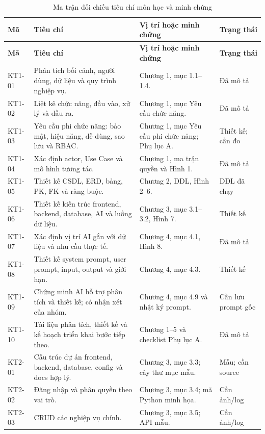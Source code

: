 \begin{longtable}{|C{1.0cm}|L{5.0cm}|L{4.7cm}|L{2.3cm}|}
\caption{Ma trận đối chiếu tiêu chí môn học và minh chứng}\label{tab:criteria-matrix}\\
\hline
\textbf{Mã} & \textbf{Tiêu chí} & \textbf{Vị trí hoặc minh chứng} & \textbf{Trạng thái}\\
\hline\endfirsthead
\hline
\textbf{Mã} & \textbf{Tiêu chí} & \textbf{Vị trí hoặc minh chứng} & \textbf{Trạng thái}\\
\hline\endhead
KT1-01 & Phân tích bối cảnh, người dùng, dữ liệu và quy trình nghiệp vụ. & Chương 1, mục 1.1--1.4. & Đã mô tả\\\hline
KT1-02 & Liệt kê chức năng, đầu vào, xử lý và đầu ra. & Chương 1, mục Yêu cầu chức năng. & Đã mô tả\\\hline
KT1-03 & Yêu cầu phi chức năng: bảo mật, hiệu năng, dễ dùng, sao lưu và RBAC. & Chương 1, mục Yêu cầu phi chức năng; Phụ lục A. & Thiết kế; cần đo\\\hline
KT1-04 & Xác định actor, Use Case và mô hình tương tác. & Chương 1, ma trận quyền và Hình 1. & Đã mô tả\\\hline
KT1-05 & Thiết kế CSDL, ERD, bảng, PK, FK và ràng buộc. & Chương 2, DDL, Hình 2--6. & DDL đã chạy\\\hline
KT1-06 & Thiết kế kiến trúc frontend, backend, database, AI và luồng dữ liệu. & Chương 3, mục 3.1--3.2, Hình 7. & Thiết kế\\\hline
KT1-07 & Xác định vị trí AI gắn với dữ liệu và nhu cầu thực tế. & Chương 4, mục 4.1, Hình 8. & Đã mô tả\\\hline
KT1-08 & Thiết kế system prompt, user prompt, input, output và giới hạn. & Chương 4, mục 4.3. & Thiết kế\\\hline
KT1-09 & Chứng minh AI hỗ trợ phân tích và thiết kế; có nhận xét của nhóm. & Chương 4, mục 4.9 và nhật ký prompt. & Cần lưu prompt gốc\\\hline
KT1-10 & Tài liệu phân tích, thiết kế và kế hoạch triển khai bước tiếp theo. & Chương 1--5 và checklist Phụ lục A. & Đã mô tả\\\hline
KT2-01 & Cấu trúc dự án frontend, backend, database, config và docs hợp lý. & Chương 3, mục 3.3; cây thư mục mẫu. & Mẫu; cần source\\\hline
KT2-02 & Đăng nhập và phân quyền theo vai trò. & Chương 3, mục 3.4; mã Python minh họa. & Cần ảnh/log\\\hline
KT2-03 & CRUD các nghiệp vụ chính. & Chương 3, mục 3.5; API mẫu. & Cần ảnh/log\\\hline

\end{longtable}
